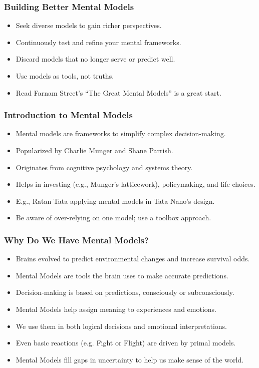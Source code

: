 \begin{frame}[fragile]\frametitle{Building Better Mental Models}
      \begin{itemize}
        \item Seek diverse models to gain richer perspectives.
        \item Continuously test and refine your mental frameworks.
        \item Discard models that no longer serve or predict well.
        \item Use models as tools, not truths.
        \item Read Farnam Street's ``The Great Mental Models'' is a great start.
      \end{itemize}
\end{frame}



\begin{frame}[fragile]\frametitle{Introduction to Mental Models}
  \begin{itemize}
    \item Mental models are frameworks to simplify complex decision-making.
    \item Popularized by Charlie Munger and Shane Parrish.
    \item Originates from cognitive psychology and systems theory.
    \item Helps in investing (e.g., Munger's latticework), policymaking, and life choices.
    \item E.g., Ratan Tata applying mental models in Tata Nano's design.
    \item Be aware of over-relying on one model; use a toolbox approach.
  \end{itemize}
\end{frame}

\begin{frame}[fragile]\frametitle{Why Do We Have Mental Models?}
      \begin{itemize}
        \item Brains evolved to predict environmental changes and increase survival odds.
        \item Mental Models are tools the brain uses to make accurate predictions.
        \item Decision-making is based on predictions, consciously or subconsciously.
        \item Mental Models help assign meaning to experiences and emotions.
        \item We use them in both logical decisions and emotional interpretations.
        \item Even basic reactions (e.g. Fight or Flight) are driven by primal models.
        \item Mental Models fill gaps in uncertainty to help us make sense of the world.
      \end{itemize}
\end{frame}

